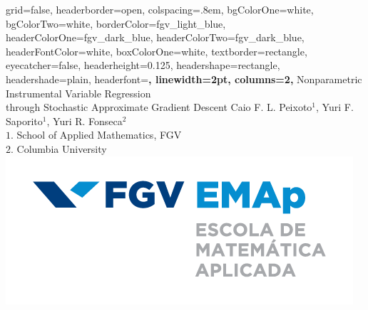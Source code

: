 \documentclass[
    a0paper,
    portrait,
    margin=3cm,
]{baposter}
\theoremstyle{fancy} %
\theoremstyle{regular}
\begin{document}

\begin{poster}
{
    grid=false,
    headerborder=open, %
    colspacing=.8em, %
    bgColorOne=white, %
    bgColorTwo=white, %
    borderColor=fgv_light_blue, %
    headerColorOne=fgv_dark_blue, %
    headerColorTwo=fgv_dark_blue, %
    headerFontColor=white, %
    boxColorOne=white, %
    textborder=rectangle, %
    eyecatcher=false, %
    headerheight=0.125\textheight, %
    headershape=rectangle, %
    headershade=plain,
    headerfont=\Large\bf\sffamily\centering, %
    linewidth=2pt, %
    columns=2,
}
{}
%
%
{
{
    \vspace{1.3em}
    {\huge \sffamily Nonparametric Instrumental Variable Regression \\ through Stochastic Approximate  Gradient Descent}
    \vspace{.1em}
}
}
{
        \small{Caio F. L. Peixoto$^1$, Yuri F. Saporito$^1$, Yuri R. Fonseca$^2$}
    {
        \vspace{0.1em} \\
        \small{$1.$ School of Applied Mathematics, FGV}
        \vspace{.1em} \\
        \small{$2.$ Columbia University}
        \vspace{.5em}
    }
}
{
    \includegraphics[width=.27\linewidth]{emap_logo.png}
} %



\end{poster}
\end{document}
